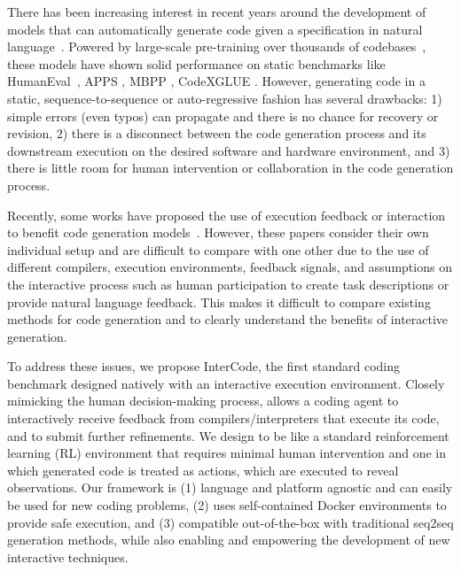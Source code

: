 There has been increasing interest in recent years around the development of models that can automatically generate code given a specification in natural language~\cite{feng2020codebert, wang2021codet5, clement2020pymt5, alphacode, le2022coderl}. Powered by large-scale pre-training over thousands of codebases~\cite{Agashe2019JuICeAL, husain2020codesearchnet, gao2020pile}, these models have shown solid performance on static benchmarks like HumanEval~\cite{chen2021evaluating}, APPS \cite{hendrycksapps2021}, MBPP \cite{austin2021program}, CodeXGLUE \cite{lu2021codexglue}. However, generating code in a static, sequence-to-sequence or auto-regressive fashion has several drawbacks: 1) simple errors (even typos) can propagate and there is no chance for recovery or revision, 2) there is a disconnect between the code generation process and its downstream execution on the desired software and hardware environment, and 3) there is little room for human intervention or collaboration in the code generation process. 



Recently, some works have proposed the use of execution feedback or interaction~\cite{wang2023interactive} to benefit code generation models~\cite{Lai2022DS1000, huang-etal-2022-execution, wang2023executionbased, hendrycksapps2021}. However, these papers consider their own individual setup and are difficult to compare with one other due to the use of different compilers, execution environments, feedback signals, and assumptions on the interactive process such as human participation to create task descriptions or provide natural language feedback. This makes it difficult to compare existing methods for code generation and to clearly understand the benefits of interactive generation. 

To address these issues, we propose InterCode, the first standard coding benchmark designed natively with an interactive execution environment. Closely mimicking the human decision-making process, \benchmark{} allows a coding agent to interactively receive feedback from compilers/interpreters that execute its code, and to submit further refinements. We design \benchmark{} to be like a standard reinforcement learning (RL) environment that requires minimal human intervention and one in which generated code is treated as actions, which are executed to reveal observations. Our framework is (1) language and platform agnostic and can easily be used for new coding problems, (2) uses self-contained Docker environments to provide safe execution, and (3) compatible out-of-the-box with traditional seq2seq generation methods, while also enabling and empowering the development of new interactive techniques. 

